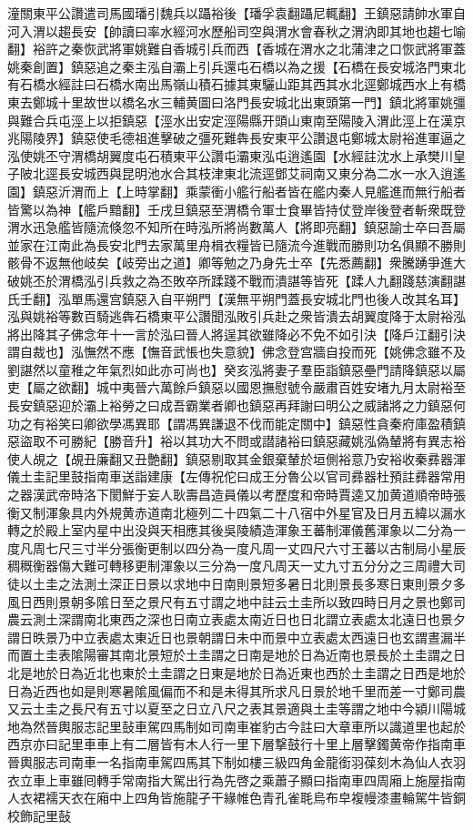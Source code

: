 潼關東平公讚遣司馬國璠引魏兵以躡裕後【璠孚袁翻躡尼輒翻】王鎮惡請帥水軍自河入渭以趨長安【帥讀曰率水經河水歷船司空與渭水會春秋之渭汭即其地也趨七喻翻】裕許之秦恢武將軍姚難自香城引兵而西【香城在渭水之北蒲津之口恢武將軍蓋姚秦創置】鎮惡追之秦主泓自灞上引兵還屯石橋以為之援【石橋在長安城洛門東北有石橋水經註曰石橋水南出馬嶺山積石據其東驪山距其西其水北逕鄭城西水上有橋東去鄭城十里故世以橋名水三輔黄圖曰洛門長安城北出東頭第一門】鎮北將軍姚彊與難合兵屯涇上以拒鎮惡【涇水出安定涇陽縣开頭山東南至陽陵入渭此涇上在漢京兆陽陵界】鎮惡使毛德祖進擊破之彊死難犇長安東平公讚退屯鄭城太尉裕進軍逼之泓使姚丕守渭橋胡翼度屯石積東平公讚屯灞東泓屯逍遙園【水經註沈水上承樊川皇子陂北逕長安城西與昆明池水合其枝津東北流逕鄧艾祠南又東分為二水一水入逍遙園】鎮惡沂渭而上【上時掌翻】乘蒙衝小艦行船者皆在艦内秦人見艦進而無行船者皆驚以為神【艦戶黯翻】壬戌旦鎮惡至渭橋令軍士食畢皆持仗登岸後登者斬衆既登渭水迅急艦皆隨流倏忽不知所在時泓所將尚數萬人【將即亮翻】鎮惡諭士卒曰吾屬並家在江南此為長安北門去家萬里舟楫衣糧皆已隨流今進戰而勝則功名俱顯不勝則骸骨不返無他岐矣【岐旁出之道】卿等勉之乃身先士卒【先悉薦翻】衆騰踴爭進大破姚丕於渭橋泓引兵救之為丕敗卒所蹂踐不戰而潰諶等皆死【蹂人九翻踐慈演翻諶氏壬翻】泓單馬還宫鎮惡入自平朔門【漢無平朔門蓋長安城北門也後人改其名耳】泓與姚裕等數百騎逃犇石橋東平公讚聞泓敗引兵赴之衆皆潰去胡翼度降于太尉裕泓將出降其子佛念年十一言於泓曰晉人將逞其欲雖降必不免不如引決【降戶江翻引決謂自裁也】泓憮然不應【憮音武悵也失意貌】佛念登宫牆自投而死【姚佛念雖不及劉諶然以童稚之年氣烈如此亦可尚也】癸亥泓將妻子羣臣詣鎮惡壘門請降鎮惡以屬吏【屬之欲翻】城中夷晉六萬餘戶鎮惡以國恩撫慰號令嚴肅百姓安堵九月太尉裕至長安鎮惡迎於灞上裕勞之曰成吾霸業者卿也鎮惡再拜謝曰明公之威諸將之力鎮惡何功之有裕笑曰卿欲學馮異耶【謂馮異謙退不伐而能定關中】鎮惡性貪秦府庫盈積鎮惡盜取不可勝紀【勝音升】裕以其功大不問或譛諸裕曰鎮惡藏姚泓偽輦將有異志裕使人覘之【覘丑廉翻又丑艶翻】鎮惡剔取其金銀棄輦於垣側裕意乃安裕收秦彞器渾儀土圭記里鼓指南車送詣建康【左傳祝佗曰成王分魯公以官司彞器杜預註彞器常用之器漢武帝時洛下閡鮮于妄人耿壽昌造員儀以考歷度和帝時賈逵又加黄道順帝時張衡又制渾象具内外規黄赤道南北極列二十四氣二十八宿中外星官及日月五緯以漏水轉之於殿上室内星中出没與天相應其後吳陵績造渾象王蕃制渾儀舊渾象以二分為一度凡周七尺三寸半分張衡更制以四分為一度凡周一丈四尺六寸王蕃以古制局小星辰稠穊衡器傷大難可轉移更制渾象以三分為一度凡周天一丈九寸五分分之三周禮大司徒以土圭之法測土深正日景以求地中日南則景短多暑日北則景長多寒日東則景夕多風日西則景朝多隂日至之景尺有五寸謂之地中註云土圭所以致四時日月之景也鄭司農云測土深謂南北東西之深也日南立表處太南近日也日北謂立表處太北遠日也景夕謂日昳景乃中立表處太東近日也景朝謂日未中而景中立表處太西遠日也玄謂晝漏半而置土圭表隂陽審其南北景短於土圭謂之日南是地於日為近南也景長於土圭謂之日北是地於日為近北也東於土圭謂之日東是地於日為近東也西於土圭謂之日西是地於日為近西也如是則寒暑隂風偏而不和是未得其所求凡日景於地千里而差一寸鄭司農又云土圭之長尺有五寸以夏至之日立八尺之表其景適與土圭等謂之地中今潁川陽城地為然晉輿服志記里鼔車駕四馬制如司南車崔豹古今註曰大章車所以識道里也起於西京亦曰記里車車上有二層皆有木人行一里下層撃鼓行十里上層擊鐲黄帝作指南車晉輿服志司南車一名指南車駕四馬其下制如樓三級四角金龍銜羽葆刻木為仙人衣羽衣立車上車雖囘轉手常南指大駕出行為先啓之乘蕭子顯曰指南車四周廂上施屋指南人衣裙襦天衣在廂中上四角皆施龍孑干緣帷色青孔雀毦烏布皁複幔漆畫輪駕牛皆銅校飾記里鼔